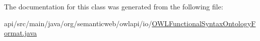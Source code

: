 The documentation for this class was generated from the following file\-:\begin{DoxyCompactItemize}
\item 
api/src/main/java/org/semanticweb/owlapi/io/\hyperlink{_o_w_l_functional_syntax_ontology_format_8java}{O\-W\-L\-Functional\-Syntax\-Ontology\-Format.\-java}\end{DoxyCompactItemize}
